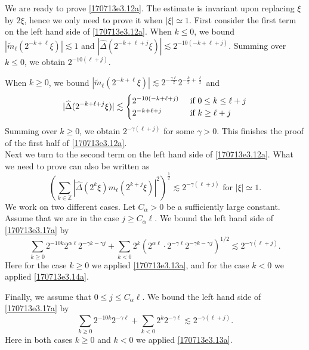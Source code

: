 \documentclass[12pt,leqno]{amsart}
\def\Z{\mathbb{Z}}
\theoremstyle{plain}
\numberwithin{equation}{section}
\begin{document}
We are ready to prove \eqref{170713e3.12a}. The estimate is invariant upon replacing $\xi$ by $2\xi$, hence we only need to prove it when $|\xi| \simeq 1$. First consider the first term on the left hand side of \eqref{170713e3.12a}. When $k\le 0$, we bound $|\tilde{m}_{\ell} (2^{-k+\ell}\xi)|\lesssim 1$ and $|\widehat{\Delta}(2^{-k+ \ell +j}\xi)|\lesssim 2^{-10(-k+\ell+j)}$. Summing over $k\le 0$, we obtain $2^{-10( \ell +j)}$.

When $k\ge 0$, we bound $|\tilde{m}_{\ell} (2^{-k+\ell}\xi)|\lesssim 2^{-\frac{\gamma \ell}{2}}2^{-\frac{k}{2}+\frac{\ell}{2}}$ and 
\[
|\widehat{\Delta}(2^{-k+\ell+j}\xi)| \lesssim
  \begin{cases} 
       2^{-10(-k+\ell +j)}   \hfill & \text{ if $0\le k\le \ell + j$} \\
       2^{-k+\ell + j} \hfill & \text{ if $k\ge \ell +j$} \\
  \end{cases}
\]
Summing over $k\ge 0$, we obtain $2^{-\gamma(\ell + j)}$ for some $\gamma>0$. This finishes the proof of the first half of \eqref{170713e3.12a}.\\

Next we turn to the second term on the left hand side of \eqref{170713e3.12a}. What we need to prove can also be written as 
\begin{equation}\label{170713e3.17a}
\left( \sum_{k \in \Z} |\widehat{\Delta}(2^{k} \xi) m_{\ell}(2^{k +j} \xi)|^2 \right)^{\frac{1}{2}} \lesssim 2^{-\gamma (\ell +j)} \text{ for } |\xi| \simeq 1.
\end{equation}
We work on two different cases. Let $C_{\alpha}>0$ be a sufficiently large constant. Assume that we are in the case $j\ge C_{\alpha } \ell $. We bound the left hand side of \eqref{170713e3.17a} by 
\[
\sum_{k\ge 0} 2^{-10 k} 2^{\alpha \ell} 2^{-\gamma k -\gamma j} + \sum_{k<0} 2^k (2^{\alpha \ell}\cdot 2^{-\gamma \ell} 2^{-\gamma k-\gamma j})^{1/2}  \lesssim 2^{-\gamma (\ell +j)}.
\]
Here for the case $k\ge 0$ we applied \eqref{170713e3.13a}, and for the case $k<0$ we applied \eqref{170713e3.14a}. 

Finally, we assume that $0\le j\le C_{\alpha} \ell$. We bound the left hand side of \eqref{170713e3.17a} by 
\[
\sum_{k\ge 0} 2^{-10 k} 2^{-\gamma \ell} + \sum_{k<0}2^k 2^{-\gamma \ell} \lesssim 2^{-\gamma (\ell + j)}.
\]
Here in both cases $k\ge 0$ and $k<0$ we applied \eqref{170713e3.13a}.
\end{document}

